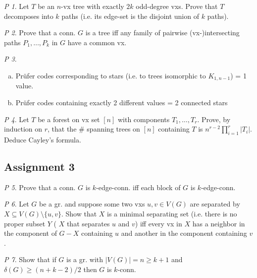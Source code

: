 \documentclass[11pt, fleqn, a4paper, landscape]{article}
\theoremstyle{plain} %
\theoremstyle{remark} %
\newtheorem{problem}{P}
\theoremstyle{definition} %
\begin{document}
\begin{multicols}{5}
\begin{problem}
Let $T$ be an $n$-vx tree with exactly $2k$ odd-degree vxs. Prove that $T$ decomposes into $k$ paths (i.e. its edge-set is the disjoint union of $k$ paths).
\end{problem}

\begin{problem}
Prove that a conn. $G$ is a tree iff any family of pairwise (vx-)intersecting paths $P_1,\dots,P_k$ in $G$ have a common vx.
\end{problem}

\begin{problem}
\begin{enumerate}[(a)]
\item Prüfer codes corresponding to stars (i.e. to trees isomorphic to $K_{1,n-1}$) = 1 value.
\item Prüfer codes containing exactly 2 different values = 2 connected stars
\end{enumerate}
\end{problem}

\begin{problem}
Let $T$ be a forest on vx set $[n]$ with components $T_1,\dots,T_r$. Prove, by induction on $r$, that the \# spanning trees on $[n]$ containing $T$ is $n^{r-2}\prod_{i=1}^{r}|T_i|$. Deduce Cayley's formula.
\end{problem}

\subsection{Assignment 3}

\begin{problem}
Prove that a conn. $G$ is $k$-edge-conn. iff each block of $G$ is $k$-edge-conn.
\end{problem}

\begin{problem}
Let $G$ be a gr. and suppose some two vxs $u, v \in V (G)$ are separated by $X \subseteq V (G)\setminus\{u,v\}$. Show that $X$ is a minimal separating set (i.e. there is no proper subset $Y$ ( $X$ that separates $u$ and $v$) iff every vx in $X$ has a neighbor in the component
of $G-X$ containing $u$ and another in the component containing $v$.
\end{problem}

\begin{problem}
Show that if $G$ is a gr. with $|V (G)| = n \ge k + 1$ and $\delta(G) \ge(n + k-2)/2$ then $G$ is $k$-conn.
\end{problem}


\end{multicols}
\end{document}
